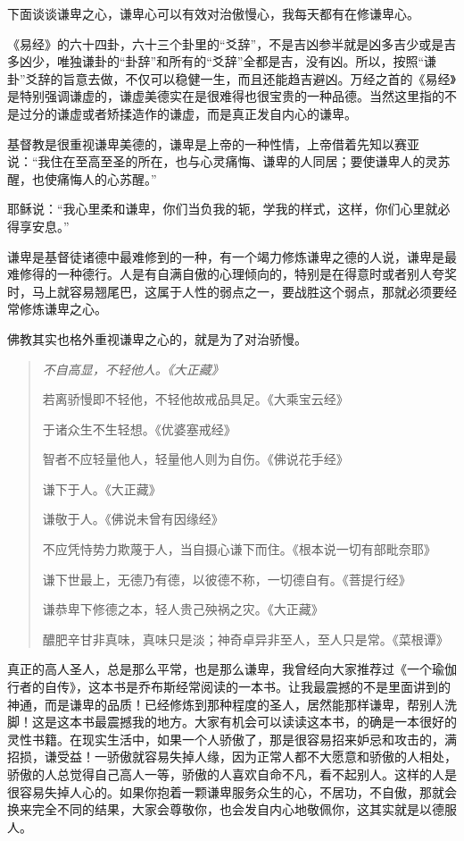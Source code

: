 下面谈谈谦卑之心，谦卑心可以有效对治傲慢心，我每天都有在修谦卑心。

《易经》的六十四卦，六十三个卦里的“爻辞”，不是吉凶参半就是凶多吉少或是吉多凶少，唯独谦卦的“卦辞”和所有的“爻辞”全都是吉，没有凶。所以，按照“谦卦”爻辞的旨意去做，不仅可以稳健一生，而且还能趋吉避凶。万经之首的《易经》是特别强调谦虚的，谦虚美德实在是很难得也很宝贵的一种品德。当然这里指的不是过分的谦虚或者矫揉造作的谦虚，而是真正发自内心的谦卑。

基督教是很重视谦卑美德的，谦卑是上帝的一种性情，上帝借着先知以赛亚说：“我住在至高至圣的所在，也与心灵痛悔、谦卑的人同居；要使谦卑人的灵苏醒，也使痛悔人的心苏醒。”

耶稣说：“我心里柔和谦卑，你们当负我的轭，学我的样式，这样，你们心里就必得享安息。”

谦卑是基督徒诸德中最难修到的一种，有一个竭力修炼谦卑之德的人说，谦卑是最难修得的一种德行。人是有自满自傲的心理倾向的，特别是在得意时或者别人夸奖时，马上就容易翘尾巴，这属于人性的弱点之一，要战胜这个弱点，那就必须要经常修炼谦卑之心。

佛教其实也格外重视谦卑之心的，就是为了对治骄慢。

\begin{quotation}\it
    不自高显，不轻他人。《大正藏》

    若离骄慢即不轻他，不轻他故戒品具足。《大乘宝云经》

    于诸众生不生轻想。《优婆塞戒经》

    智者不应轻量他人，轻量他人则为自伤。《佛说花手经》

    谦下于人。《大正藏》

    谦敬于人。《佛说未曾有因缘经》

    不应凭恃势力欺蔑于人，当自摄心谦下而住。《根本说一切有部毗奈耶》

    谦下世最上，无德乃有德，以彼德不称，一切德自有。《菩提行经》

    谦恭卑下修德之本，轻人贵己殃祸之灾。《大正藏》

    醲肥辛甘非真味，真味只是淡；神奇卓异非至人，至人只是常。《菜根谭》
\end{quotation}

真正的高人圣人，总是那么平常，也是那么谦卑，我曾经向大家推荐过《一个瑜伽行者的自传》，这本书是乔布斯经常阅读的一本书。让我最震撼的不是里面讲到的神通，而是谦卑的品质！已经修炼到那种程度的圣人，居然能那样谦卑，帮别人洗脚！这是这本书最震撼我的地方。大家有机会可以读读这本书，的确是一本很好的灵性书籍。在现实生活中，如果一个人骄傲了，那是很容易招来妒忌和攻击的，满招损，谦受益！一骄傲就容易失掉人缘，因为正常人都不大愿意和骄傲的人相处，骄傲的人总觉得自己高人一等，骄傲的人喜欢自命不凡，看不起别人。这样的人是很容易失掉人心的。如果你抱着一颗谦卑服务众生的心，不居功，不自傲，那就会换来完全不同的结果，大家会尊敬你，也会发自内心地敬佩你，这其实就是以德服人。

